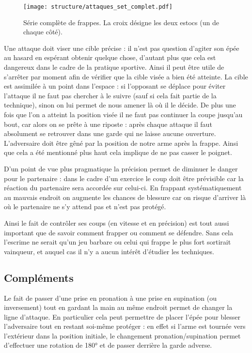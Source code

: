 \begin{figure}[ht]
	\centering
	\texttt{[image: structure/attaques\_set\_complet.pdf]}
	\caption{Série complète de frappes.
	La croix désigne les deux estocs (un de chaque côté).}
	\label{att:fig:série-complète}
\end{figure}


Une attaque doit viser une cible précise : il n'est pas question d'agiter son épée au hasard en espérant obtenir quelque chose, d'autant plus que cela est dangereux dans le cadre de la pratique sportive.
Ainsi il peut être utile de s'arrêter par moment afin de vérifier que la cible visée a bien été atteinte.
La cible est assimilée à un point dans l'espace : si l'opposant se déplace pour éviter l'attaque il ne faut pas chercher à le suivre (sauf si cela fait partie de la technique), sinon on lui permet de nous amener là où il le décide.
De plus une fois que l'on a atteint la position visée il ne faut pas continuer la coupe jusqu'au bout, car alors on se prête à une riposte : après chaque attaque il faut absolument se retrouver dans une garde qui ne laisse aucune ouverture.
L'adversaire doit être gêné par la position de notre arme après la frappe.
Ainsi que cela a été mentionné plus haut cela implique de ne pas casser le poignet.

D'un point de vue plus pragmatique la précision permet de diminuer le danger pour le partenaire : dans le cadre d'un exercice le coup doit être prévisible car la réaction du partenaire sera accordée sur celui-ci.
En frappant systématiquement au mauvais endroit on augmente les chances de blessure car on risque d'arriver là où le partenaire ne s'y attend pas et n'est pas protégé.

Ainsi le fait de contrôler ses coups (en vitesse et en précision) est tout aussi important que de savoir comment frapper ou comment se défendre.
Sans cela l'escrime ne serait qu'un jeu barbare ou celui qui frappe le plus fort sortirait vainqueur, et auquel cas il n'y a aucun intérêt d'étudier les techniques.


\subsection{Compléments}


Le fait de passer d'une prise en pronation à une prise en supination (ou inversement) tout en gardant la main au même endroit permet de changer la ligne d'attaque.
En particulier cela peut permettre de placer l'épée pour blesser l'adversaire tout en restant soi-même protéger : en effet si l'arme est tournée vers l'extérieur dans la position initiale, le changement pronation/supination permet d'effectuer une rotation de \ang{180} et de passer derrière la garde adverse.


